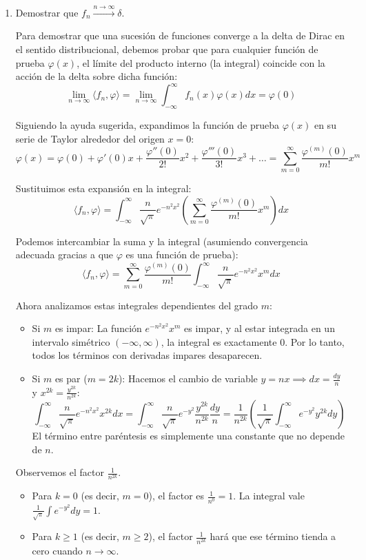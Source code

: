 \documentclass[11pt,spanish]{article}
\begin{document}
\begin{enumerate}
\item Demostrar que $f_n \xrightarrow{n \to \infty} \delta$.

Para demostrar que una sucesión de funciones converge a la delta de Dirac en el sentido distribucional, debemos probar que para cualquier función de prueba $\varphi(x)$, el límite del producto interno (la integral) coincide con la acción de la delta sobre dicha función:
$$\lim_{n \to \infty} \langle f_n, \varphi \rangle = \lim_{n \to \infty} \int_{-\infty}^{\infty} f_n(x) \varphi(x) dx = \varphi(0)$$

Siguiendo la ayuda sugerida, expandimos la función de prueba $\varphi(x)$ en su serie de Taylor alrededor del origen $x=0$:
$$\varphi(x) = \varphi(0) + \varphi'(0)x + \frac{\varphi''(0)}{2!}x^2 + \frac{\varphi'''(0)}{3!}x^3 + \dots = \sum_{m=0}^{\infty} \frac{\varphi^{(m)}(0)}{m!} x^m$$

Sustituimos esta expansión en la integral:
$$\langle f_n, \varphi \rangle = \int_{-\infty}^{\infty} \frac{n}{\sqrt{\pi}} e^{-n^2 x^2} \left( \sum_{m=0}^{\infty} \frac{\varphi^{(m)}(0)}{m!} x^m \right) dx$$

Podemos intercambiar la suma y la integral (asumiendo convergencia adecuada gracias a que $\varphi$ es una función de prueba):
$$\langle f_n, \varphi \rangle = \sum_{m=0}^{\infty} \frac{\varphi^{(m)}(0)}{m!} \int_{-\infty}^{\infty} \frac{n}{\sqrt{\pi}} e^{-n^2 x^2} x^m dx$$

Ahora analizamos estas integrales dependientes del grado $m$:
\begin{itemize}
\item Si $m$ es impar: La función $e^{-n^2 x^2} x^m$ es impar, y al estar integrada en un intervalo simétrico $(-\infty, \infty)$, la integral es exactamente 0. Por lo tanto, todos los términos con derivadas impares desaparecen.
\item Si $m$ es par ($m = 2k$): Hacemos el cambio de variable $y = nx \implies dx = \frac{dy}{n}$ y $x^{2k} = \frac{y^{2k}}{n^{2k}}$:
    $$\int_{-\infty}^{\infty} \frac{n}{\sqrt{\pi}} e^{-n^2 x^2} x^{2k} dx = \int_{-\infty}^{\infty} \frac{n}{\sqrt{\pi}} e^{-y^2} \frac{y^{2k}}{n^{2k}} \frac{dy}{n} = \frac{1}{n^{2k}} \left( \frac{1}{\sqrt{\pi}} \int_{-\infty}^{\infty} e^{-y^2} y^{2k} dy \right)$$
    El término entre paréntesis es simplemente una constante que no depende de $n$.
\end{itemize}

Observemos el factor $\frac{1}{n^{2k}}$. 
\begin{itemize}
\item Para $k = 0$ (es decir, $m = 0$), el factor es $\frac{1}{n^0} = 1$. La integral vale $\frac{1}{\sqrt{\pi}} \int e^{-y^2} dy = 1$.
\item Para $k \ge 1$ (es decir, $m \ge 2$), el factor $\frac{1}{n^{2k}}$ hará que ese término tienda a cero cuando $n \to \infty$.
\end{itemize}


\end{enumerate}
\end{document}
